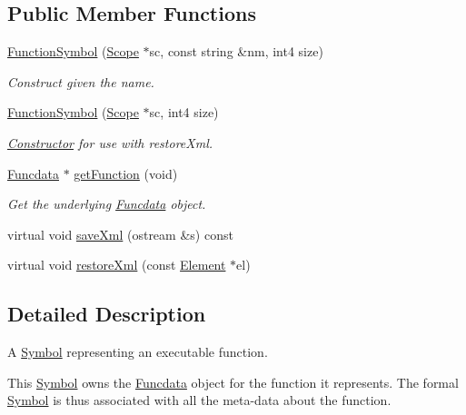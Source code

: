 \subsection*{Public Member Functions}
\begin{DoxyCompactItemize}
\item 
\mbox{\hyperlink{class_function_symbol_afcc837dcc5610f387be7fbf78b220496}{Function\+Symbol}} (\mbox{\hyperlink{class_scope}{Scope}} $\ast$sc, const string \&nm, int4 size)
\begin{DoxyCompactList}\small\item\em Construct given the name. \end{DoxyCompactList}\item 
\mbox{\hyperlink{class_function_symbol_aa2b316a5920f3008807c6cf7d02337ec}{Function\+Symbol}} (\mbox{\hyperlink{class_scope}{Scope}} $\ast$sc, int4 size)
\begin{DoxyCompactList}\small\item\em \mbox{\hyperlink{class_constructor}{Constructor}} for use with restore\+Xml. \end{DoxyCompactList}\item 
\mbox{\hyperlink{class_funcdata}{Funcdata}} $\ast$ \mbox{\hyperlink{class_function_symbol_ab54ed780e0dd1abdc9447c2e772114fb}{get\+Function}} (void)
\begin{DoxyCompactList}\small\item\em Get the underlying \mbox{\hyperlink{class_funcdata}{Funcdata}} object. \end{DoxyCompactList}\item 
virtual void \mbox{\hyperlink{class_function_symbol_a0947d5735918439e8de8f4e6084239f2}{save\+Xml}} (ostream \&s) const
\item 
virtual void \mbox{\hyperlink{class_function_symbol_afba4e81eed1ad378ae7f0531ec8f3d2b}{restore\+Xml}} (const \mbox{\hyperlink{class_element}{Element}} $\ast$el)
\end{DoxyCompactItemize}


\subsection{Detailed Description}
A \mbox{\hyperlink{class_symbol}{Symbol}} representing an executable function. 

This \mbox{\hyperlink{class_symbol}{Symbol}} owns the \mbox{\hyperlink{class_funcdata}{Funcdata}} object for the function it represents. The formal \mbox{\hyperlink{class_symbol}{Symbol}} is thus associated with all the meta-\/data about the function. 


